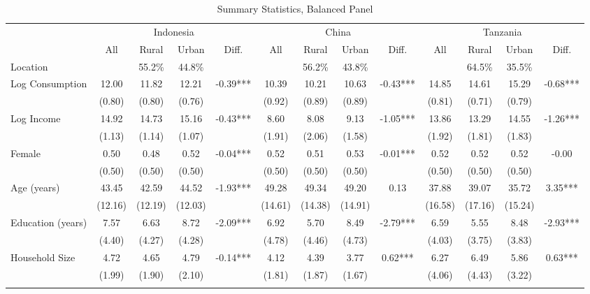 \begin{table} \centering
\caption{Summary Statistics, Balanced Panel}\label{tab:summary_stats_combined_bal}
\begin{threeparttable}
\begin{tabular}{l cccc cccc cccc} \toprule
& \multicolumn{4}{c}{Indonesia} & \multicolumn{4}{c}{China} & \multicolumn{4}{c}{Tanzania} \\
\cmidrule(lr){2-5} \cmidrule(lr){6-9} \cmidrule(lr){10-13}
& All & Rural & Urban & Diff. & All & Rural & Urban & Diff. & All & Rural & Urban & Diff. \\
Location &  &   55.2\% &   44.8\% &  &  &   56.2\% &   43.8\% &  &  &   64.5\% &   35.5\% &  \\  \addlinespace \addlinespace
Log Consumption & 12.00 & 11.82 & 12.21 & -0.39*** & 10.39 & 10.21 & 10.63 & -0.43*** & 14.85 & 14.61 & 15.29 & -0.68*** \\
 & (0.80) & (0.80) & (0.76) &  & (0.92) & (0.89) & (0.89) &  & (0.81) & (0.71) & (0.79) &  \\  \addlinespace
Log Income & 14.92 & 14.73 & 15.16 & -0.43*** & 8.60 & 8.08 & 9.13 & -1.05*** & 13.86 & 13.29 & 14.55 & -1.26*** \\
 & (1.13) & (1.14) & (1.07) &  & (1.91) & (2.06) & (1.58) &  & (1.92) & (1.81) & (1.83) &  \\  \addlinespace
Female & 0.50 & 0.48 & 0.52 & -0.04*** & 0.52 & 0.51 & 0.53 & -0.01*** & 0.52 & 0.52 & 0.52 & -0.00 \\
 & (0.50) & (0.50) & (0.50) &  & (0.50) & (0.50) & (0.50) &  & (0.50) & (0.50) & (0.50) &  \\  \addlinespace
Age (years) & 43.45 & 42.59 & 44.52 & -1.93*** & 49.28 & 49.34 & 49.20 & 0.13 & 37.88 & 39.07 & 35.72 & 3.35*** \\
 & (12.16) & (12.19) & (12.03) &  & (14.61) & (14.38) & (14.91) &  & (16.58) & (17.16) & (15.24) &  \\  \addlinespace
Education (years) & 7.57 & 6.63 & 8.72 & -2.09*** & 6.92 & 5.70 & 8.49 & -2.79*** & 6.59 & 5.55 & 8.48 & -2.93*** \\
 & (4.40) & (4.27) & (4.28) &  & (4.78) & (4.46) & (4.73) &  & (4.03) & (3.75) & (3.83) &  \\  \addlinespace
Household Size & 4.72 & 4.65 & 4.79 & -0.14*** & 4.12 & 4.39 & 3.77 & 0.62*** & 6.27 & 6.49 & 5.86 & 0.63*** \\
 & (1.99) & (1.90) & (2.10) &  & (1.81) & (1.87) & (1.67) &  & (4.06) & (4.43) & (3.22) &  \\  \addlinespace

\end{tabular}
\end{threeparttable}
\end{table}
